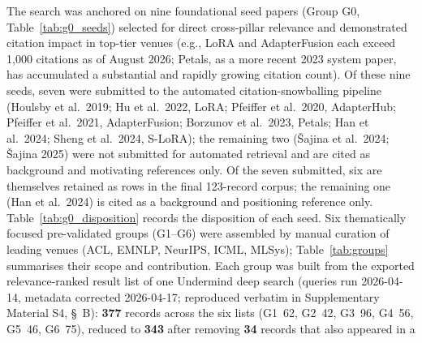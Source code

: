 The search was anchored on nine foundational seed papers (Group G0,
Table~\ref{tab:g0_seeds}) selected
for direct cross-pillar relevance and demonstrated citation impact in
top-tier venues (e.g., LoRA and AdapterFusion each exceed 1,000 citations as
of August 2026; Petals, as a more recent 2023 system paper, has accumulated a
substantial and rapidly growing citation count). %
Of these nine seeds, seven were submitted to the automated
citation-snowballing pipeline (Houlsby et al.\ 2019; Hu et al.\ 2022, LoRA;
Pfeiffer et al.\ 2020, AdapterHub; Pfeiffer et al.\ 2021, AdapterFusion;
Borzunov et al.\ 2023, Petals; Han et al.\ 2024; Sheng et al.\ 2024, S-LoRA);
the remaining two ({\v{S}}ajina et al.\ 2024; {\v{S}}ajina 2025) were not
submitted for automated retrieval and are cited as background and
motivating references only. \sloppy Of the seven submitted, six are themselves retained
as rows in the final 123-record corpus; the remaining one (Han et al.\ 2024) is
cited as a background and positioning reference only.
Table~\ref{tab:g0_disposition} records the
disposition of each seed. Six thematically focused
pre-validated groups (G1--G6) were assembled
by manual curation of leading venues (ACL, EMNLP, NeurIPS, ICML, MLSys);
Table~\ref{tab:groups} summarises their scope and contribution. Each group
was built from the exported relevance-ranked result list of one Undermind
deep search (queries run 2026-04-14, metadata corrected 2026-04-17;
reproduced verbatim in Supplementary Material S4, \S~B): \textbf{377} records
across the six lists (G1~62, G2~42, G3~96, G4~56, G5~46, G6~75), reduced to
\textbf{343} after removing \textbf{34} records that also appeared in a
